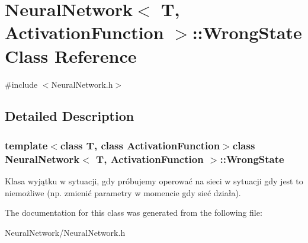 \hypertarget{class_neural_network_1_1_wrong_state}{\section{\-Neural\-Network$<$ \-T, \-Activation\-Function $>$\-:\-:\-Wrong\-State \-Class \-Reference}
\label{class_neural_network_1_1_wrong_state}
}


{\ttfamily \#include $<$\-Neural\-Network.\-h$>$}



\subsection{\-Detailed \-Description}
\subsubsection*{template$<$class T, class Activation\-Function$>$class Neural\-Network$<$ T, Activation\-Function $>$\-::\-Wrong\-State}

\-Klasa wyjątku w sytuacji, gdy próbujemy operować na sieci w sytuacji gdy jest to niemożliwe (np. zmienić parametry w momencie gdy sieć działa). 

\-The documentation for this class was generated from the following file\-:\begin{DoxyCompactItemize}
\item 
\-Neural\-Network/\-Neural\-Network.\-h\end{DoxyCompactItemize}
